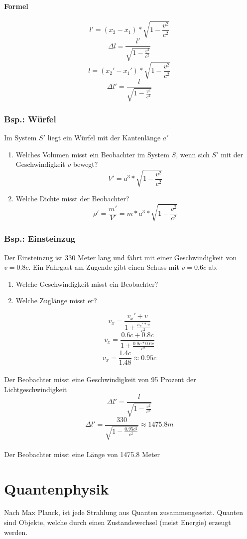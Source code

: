 \documentclass[a4paper,11pt]{article}
\begin{document}
\paragraph{Formel}
$$l' = (x_2 - x_1) * \sqrt{1 - \frac{v^2}{c^2}}$$
$$\Delta l = \frac{l'}{\sqrt{1 - \frac{v^2}{c^2}}}$$
\vspace{0.8 em}
$$l = (x_2' - x_1') * \sqrt{1 - \frac{v^2}{c^2}}$$
$$\Delta l' = \frac{l}{\sqrt{1 - \frac{v^2}{c^2}}}$$

\subsubsection{Bsp.: Würfel}
Im System $S'$ liegt ein Würfel mit der Kantenlänge $a'$
\begin{enumerate}
    \item Welches Volumen misst ein Beobachter im System $S$, wenn sich $S'$ mit der Geschwindigkeit $v$ bewegt?
    $$V' = a^3 * \sqrt{1 - \frac{v^2}{c^2}}$$
    \item Welche Dichte misst der Beobachter?
    $$\rho' = \frac{m'}{V'} = m * a^3 * \sqrt{1 - \frac{v^2}{c^2}}$$
\end{enumerate}

\newpage
\subsubsection{Bsp.: Einsteinzug}
Der Einsteinzug ist $330$ Meter lang und fährt mit einer Geschwindigkeit von $v = 0.8c$.
Ein Fahrgast am Zugende gibt einen Schuss mit $v = 0.6c$ ab.
\begin{enumerate}
    \item Welche Geschwindigkeit misst ein Beobachter?
    \item Welche Zuglänge misst er?
\end{enumerate}
$$v_x = \frac{v_x' + v}{1 + \frac{v_x' * v}{c^2}}$$
$$v_x = \frac{0.6c + 0.8c}{1 + \frac{0.8c * 0.6c}{c^2}}$$
$$v_x = \frac{1.4c}{1.48} \approx 0.95c$$
\\
Der Beobachter misst eine Geschwindigkeit von 95 Prozent der Lichtgeschwindigkeit
$$\Delta l' = \frac{l}{\sqrt{1 - \frac{v^2}{c^2}}}$$
$$\Delta l' = \frac{330}{\sqrt{1 - \frac{0.95c^2}{c^2}}} \approx 1475.8m$$
\\
Der Beobachter misst eine Länge von 1475.8 Meter

\newpage
\section{Quantenphysik}
Nach Max Planck, ist jede Strahlung aus Quanten zusammengesetzt. Quanten sind Objekte, welche durch einen Zustandswechsel (meist Energie) erzeugt werden.
\end{document}
